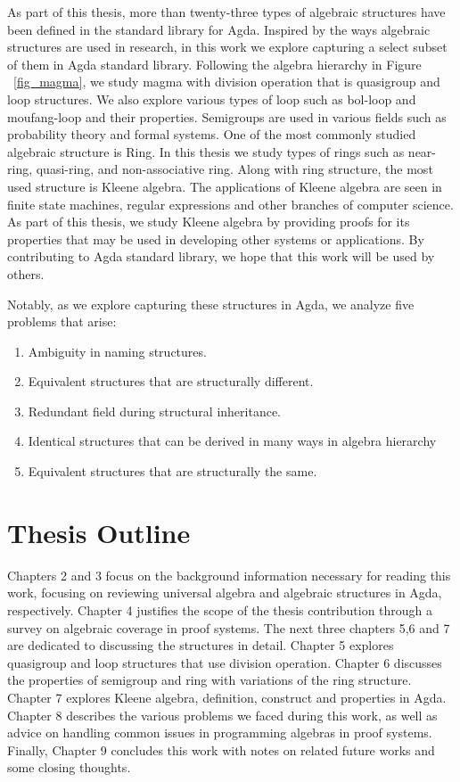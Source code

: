 As part of this thesis, more than twenty-three types of algebraic structures
have been defined in the standard library for Agda. Inspired by the ways
algebraic structures are used in research, in this work we explore capturing a
select subset of them in Agda standard library. Following the algebra hierarchy
in Figure ~\ref{fig_magma}, we study magma with division operation that is
quasigroup and loop structures. We also explore various types of loop such as
bol-loop and moufang-loop and their properties. Semigroups are used in various
fields such as probability theory and formal systems. One of the most commonly
studied algebraic structure is Ring. In this thesis we study types of rings such
as near-ring, quasi-ring, and non-associative ring. Along with ring structure,
the most used structure is Kleene algebra. The applications of Kleene algebra
are seen in finite state machines, regular expressions and other branches of
computer science. As part of this thesis, we study Kleene algebra by providing
proofs for its properties that may be used in developing other systems or
applications. By contributing to Agda standard library, we hope that this work
will be used by others. 

Notably, as we explore capturing these structures in Agda, we analyze five
problems that arise:
\begin{enumerate}
\item Ambiguity in naming structures.
\item Equivalent structures that are structurally different.
\item Redundant field during structural inheritance.
\item Identical structures that can be derived in many ways in algebra hierarchy
\item Equivalent structures that are structurally the same.
\end{enumerate}

\section{Thesis Outline}
Chapters 2 and 3 focus on the background information necessary for reading this
work, focusing on reviewing universal algebra and algebraic structures in Agda,
respectively. Chapter 4 justifies the scope of the thesis contribution through a
survey on algebraic coverage in proof systems. The next three chapters 5,6 and 7
are dedicated to discussing the structures in detail. Chapter 5 explores
quasigroup and loop structures that use division operation. Chapter 6 discusses
the properties of semigroup and ring with variations of the ring structure. Chapter
7 explores Kleene algebra, definition, construct and properties in Agda. Chapter
8 describes the various problems we faced during this work, as well as advice on
handling common issues in programming algebras in proof systems. Finally,
Chapter 9 concludes this work with notes on related future works and some
closing thoughts.
